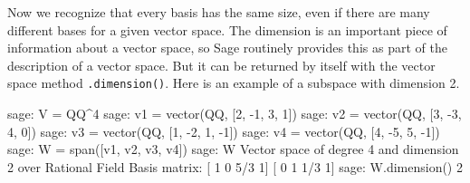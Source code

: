 Now we recognize that every basis has the same size, even if there are many different bases for a given vector space.  The dimension is an important piece of information about a vector space, so Sage routinely provides this as part of the description of a vector space.  But it can be returned by itself with the vector space method \verb?.dimension()?.  Here is an example of a subspace with dimension 2.
%
\begin{sageexample}
sage: V = QQ^4
sage: v1 = vector(QQ, [2, -1, 3,  1])
sage: v2 = vector(QQ, [3, -3, 4,  0])
sage: v3 = vector(QQ, [1, -2, 1, -1])
sage: v4 = vector(QQ, [4, -5, 5, -1])
sage: W = span([v1, v2, v3, v4])
sage: W
Vector space of degree 4 and dimension 2 over Rational Field
Basis matrix:
[  1   0 5/3   1]
[  0   1 1/3   1]
sage: W.dimension()
2
\end{sageexample}
%
\begin{sageverbatim}
\end{sageverbatim}
%
